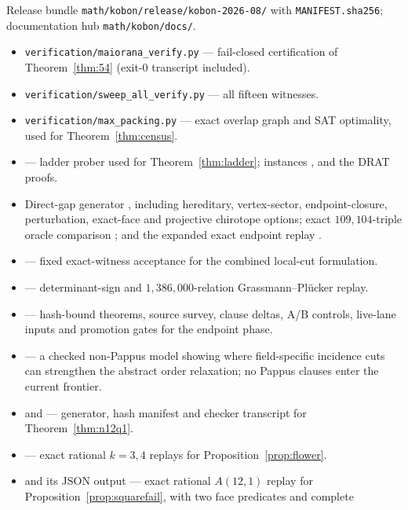 \documentclass[11pt]{article}
\theoremstyle{definition}
\begin{document}
Release bundle \texttt{math/kobon/release/kobon-2026-08/} with
\texttt{MANIFEST.sha256}; documentation hub \texttt{math/kobon/docs/}.

\begin{itemize}
\item \texttt{verification/maiorana\_verify.py} --- fail-closed certification
of Theorem~\ref{thm:54} (exit-$0$ transcript included).
\item \texttt{verification/sweep\_all\_verify.py} --- all fifteen witnesses.
\item \texttt{verification/max\_packing.py} --- exact overlap graph and SAT
optimality, used for Theorem~\ref{thm:census}.
\item {} --- ladder prober used for
Theorem~\ref{thm:ladder}; instances ,
 and the DRAT proofs.
\item Direct-gap generator , including hereditary,
vertex-sector, endpoint-closure, perturbation, exact-face and projective
chirotope options; exact $109{,}104$-triple oracle comparison
; and the expanded exact endpoint replay
.
\item {} --- fixed exact-witness
acceptance for the combined local-cut formulation.
\item {} --- determinant-sign and
$1{,}386{,}000$-relation Grassmann--Pl\"ucker replay.
\item {} --- hash-bound
theorems, source survey, clause deltas, A/B controls, live-lane inputs and
promotion gates for the endpoint phase.
\item {} --- a checked
non-Pappus model showing where field-specific incidence cuts can strengthen
the abstract order relaxation; no Pappus clauses enter the current frontier.
\item {} and
 --- generator, hash manifest and
checker transcript for Theorem~\ref{thm:n12q1}.
\item {} --- exact rational
$k=3,4$ replays for Proposition~\ref{prop:flower}.
\item {} and its JSON
output --- exact rational $A(12,1)$ replay for
Proposition~\ref{prop:squarefail}, with two face predicates and complete

\end{itemize}
\end{document}
